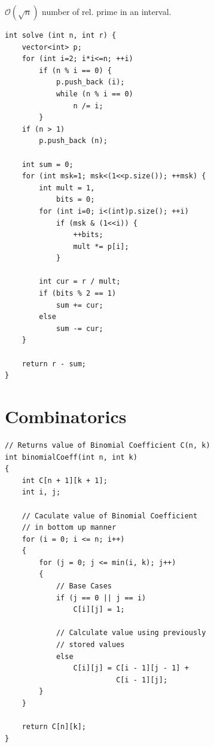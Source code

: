 \documentclass[english, 10pt]{article}
\begin{document}
$\mathcal{O}(\sqrt{n})$ number of rel. prime in an interval.

\begin{lstlisting}
int solve (int n, int r) {
    vector<int> p;
    for (int i=2; i*i<=n; ++i)
        if (n % i == 0) {
            p.push_back (i);
            while (n % i == 0)
                n /= i;
        }
    if (n > 1)
        p.push_back (n);

    int sum = 0;
    for (int msk=1; msk<(1<<p.size()); ++msk) {
        int mult = 1,
            bits = 0;
        for (int i=0; i<(int)p.size(); ++i)
            if (msk & (1<<i)) {
                ++bits;
                mult *= p[i];
            }

        int cur = r / mult;
        if (bits % 2 == 1)
            sum += cur;
        else
            sum -= cur;
    }

    return r - sum;
}
\end{lstlisting}


\section{Combinatorics}

\begin{lstlisting}
// Returns value of Binomial Coefficient C(n, k) 
int binomialCoeff(int n, int k) 
{ 
    int C[n + 1][k + 1]; 
    int i, j; 
  
    // Caculate value of Binomial Coefficient 
    // in bottom up manner 
    for (i = 0; i <= n; i++) 
    { 
        for (j = 0; j <= min(i, k); j++) 
        { 
            // Base Cases 
            if (j == 0 || j == i) 
                C[i][j] = 1; 
  
            // Calculate value using previously 
            // stored values 
            else
                C[i][j] = C[i - 1][j - 1] + 
                          C[i - 1][j]; 
        } 
    } 
  
    return C[n][k]; 
} 
\end{lstlisting}
\thispagestyle{empty}
\end{document}
